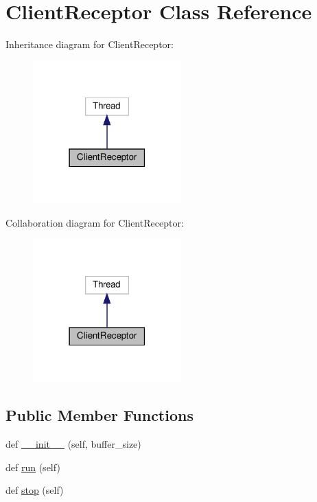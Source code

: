 \hypertarget{class_client_1_1_client_receptor}{}\section{Client\+Receptor Class Reference}
\label{class_client_1_1_client_receptor}


Inheritance diagram for Client\+Receptor\+:
\nopagebreak
\begin{figure}[H]
\begin{center}
\leavevmode
\includegraphics[width=162pt]{class_client_1_1_client_receptor__inherit__graph}
\end{center}
\end{figure}


Collaboration diagram for Client\+Receptor\+:
\nopagebreak
\begin{figure}[H]
\begin{center}
\leavevmode
\includegraphics[width=162pt]{class_client_1_1_client_receptor__coll__graph}
\end{center}
\end{figure}
\subsection*{Public Member Functions}
\begin{DoxyCompactItemize}
\item 
def \hyperlink{class_client_1_1_client_receptor_a8e9700e92cd4deb19f86ea6dc2f98cd3}{\+\_\+\+\_\+init\+\_\+\+\_\+} (self, buffer\+\_\+size)
\item 
def \hyperlink{class_client_1_1_client_receptor_ad22709b2e67308af35f55680d5a026e0}{run} (self)
\item 
def \hyperlink{class_client_1_1_client_receptor_a26ca7c1c7fcdd35378e7be97727047a6}{stop} (self)
\end{DoxyCompactItemize}
